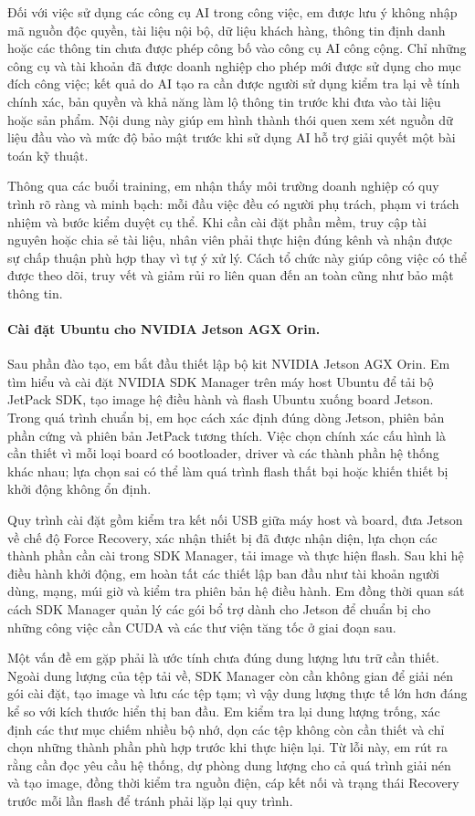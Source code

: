 Đối với việc sử dụng các công cụ AI trong công việc, em được lưu ý không nhập mã nguồn độc quyền, tài liệu nội bộ, dữ liệu khách hàng, thông tin định danh hoặc các thông tin chưa được phép công bố vào công cụ AI công cộng. Chỉ những công cụ và tài khoản đã được doanh nghiệp cho phép mới được sử dụng cho mục đích công việc; kết quả do AI tạo ra cần được người sử dụng kiểm tra lại về tính chính xác, bản quyền và khả năng làm lộ thông tin trước khi đưa vào tài liệu hoặc sản phẩm. Nội dung này giúp em hình thành thói quen xem xét nguồn dữ liệu đầu vào và mức độ bảo mật trước khi sử dụng AI hỗ trợ giải quyết một bài toán kỹ thuật.

Thông qua các buổi training, em nhận thấy môi trường doanh nghiệp có quy trình rõ ràng và minh bạch: mỗi đầu việc đều có người phụ trách, phạm vi trách nhiệm và bước kiểm duyệt cụ thể. Khi cần cài đặt phần mềm, truy cập tài nguyên hoặc chia sẻ tài liệu, nhân viên phải thực hiện đúng kênh và nhận được sự chấp thuận phù hợp thay vì tự ý xử lý. Cách tổ chức này giúp công việc có thể được theo dõi, truy vết và giảm rủi ro liên quan đến an toàn cũng như bảo mật thông tin.

\paragraph{Cài đặt Ubuntu cho NVIDIA Jetson AGX Orin.}
Sau phần đào tạo, em bắt đầu thiết lập bộ kit NVIDIA Jetson AGX Orin. Em tìm hiểu và cài đặt NVIDIA SDK Manager trên máy host Ubuntu để tải bộ JetPack SDK, tạo image hệ điều hành và flash Ubuntu xuống board Jetson. Trong quá trình chuẩn bị, em học cách xác định đúng dòng Jetson, phiên bản phần cứng và phiên bản JetPack tương thích. Việc chọn chính xác cấu hình là cần thiết vì mỗi loại board có bootloader, driver và các thành phần hệ thống khác nhau; lựa chọn sai có thể làm quá trình flash thất bại hoặc khiến thiết bị khởi động không ổn định.

Quy trình cài đặt gồm kiểm tra kết nối USB giữa máy host và board, đưa Jetson về chế độ Force Recovery, xác nhận thiết bị đã được nhận diện, lựa chọn các thành phần cần cài trong SDK Manager, tải image và thực hiện flash. Sau khi hệ điều hành khởi động, em hoàn tất các thiết lập ban đầu như tài khoản người dùng, mạng, múi giờ và kiểm tra phiên bản hệ điều hành. Em đồng thời quan sát cách SDK Manager quản lý các gói bổ trợ dành cho Jetson để chuẩn bị cho những công việc cần CUDA và các thư viện tăng tốc ở giai đoạn sau.

Một vấn đề em gặp phải là ước tính chưa đúng dung lượng lưu trữ cần thiết. Ngoài dung lượng của tệp tải về, SDK Manager còn cần không gian để giải nén gói cài đặt, tạo image và lưu các tệp tạm; vì vậy dung lượng thực tế lớn hơn đáng kể so với kích thước hiển thị ban đầu. Em kiểm tra lại dung lượng trống, xác định các thư mục chiếm nhiều bộ nhớ, dọn các tệp không còn cần thiết và chỉ chọn những thành phần phù hợp trước khi thực hiện lại. Từ lỗi này, em rút ra rằng cần đọc yêu cầu hệ thống, dự phòng dung lượng cho cả quá trình giải nén và tạo image, đồng thời kiểm tra nguồn điện, cáp kết nối và trạng thái Recovery trước mỗi lần flash để tránh phải lặp lại quy trình.

